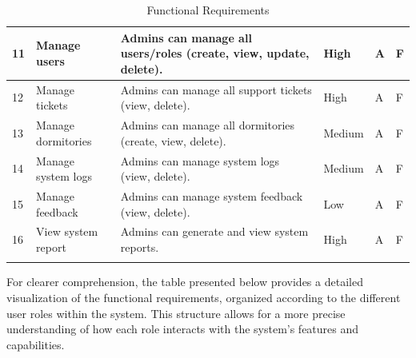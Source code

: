 \begin{longtable}{|m{0.6cm}|m{2.8cm}|m{5.4cm}|m{1.6cm}|m{1.5cm}|m{1.8cm}|}
	11 & Manage users             & Admins can manage all users/roles (create, view, update, delete).                                      & High     & A          & F           \\ \hline
	12 & Manage tickets           & Admins can manage all support tickets (view, delete).                                                  & High     & A          & F           \\ \hline
	13 & Manage dormitories       & Admins can manage all dormitories (create, view, delete).                                              & Medium   & A          & F           \\ \hline
	14 & Manage system logs       & Admins can manage system logs (view, delete).                                                          & Medium   & A          & F           \\ \hline
	15 & Manage feedback          & Admins can manage system feedback (view, delete).                                                      & Low      & A          & F           \\ \hline
	16 & View system report       & Admins can generate and view system reports.                                                           & High     & A          & F           \\ \hline
	
	
	\caption{Functional Requirements}
	\label{tab:functionalRequirement}
\end{longtable}


For clearer comprehension, the table presented below provides a detailed visualization of the functional requirements, organized according to the different user roles within the system. This structure allows for a more precise understanding of how each role interacts with the system's features and capabilities.

